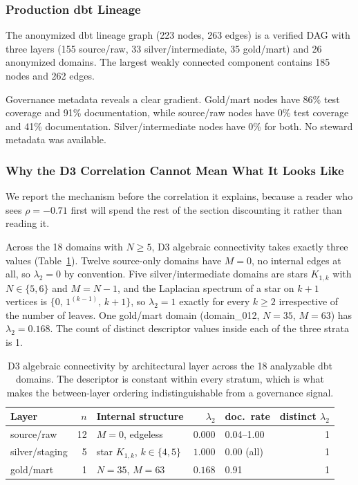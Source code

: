\documentclass[11pt,a4paper]{article}
\begin{document}
\subsubsection{Production dbt Lineage}

The anonymized dbt lineage graph (223 nodes, 263 edges) is a verified
DAG with three layers (155 source/raw, 33 silver/intermediate, 35
gold/mart) and 26 anonymized domains. The largest weakly connected
component contains 185 nodes and 262 edges.

Governance metadata reveals a clear gradient. Gold/mart nodes have
86\% test coverage and 91\% documentation, while source/raw nodes have
0\% test coverage and 41\% documentation. Silver/intermediate nodes
have 0\% for both. No steward metadata was available.

\subsubsection{Why the D3 Correlation Cannot Mean What It Looks Like}
\label{sec:degeneracy}

We report the mechanism before the correlation it explains, because a
reader who sees $\rho = -0.71$ first will spend the rest of the section
discounting it rather than reading it.

Across the 18 domains with $N \geq 5$, D3 algebraic connectivity takes
exactly three values (Table~\ref{tab:degeneracy}). Twelve source-only
domains have $M = 0$, no internal edges at all, so $\lambda_2 = 0$ by
convention. Five silver/intermediate domains are stars $K_{1,k}$ with
$N \in \{5,6\}$ and $M = N-1$, and the Laplacian spectrum of a star on
$k+1$ vertices is $\{0,\, 1^{(k-1)},\, k+1\}$, so $\lambda_2 = 1$
exactly for every $k \geq 2$ irrespective of the number of leaves. One
gold/mart domain (domain\_012, $N = 35$, $M = 63$) has
$\lambda_2 = 0.168$. The count of distinct descriptor values inside each
of the three strata is 1.

\begin{table}[htb]
\centering
\caption{D3 algebraic connectivity by architectural layer across the 18
  analyzable dbt domains. The descriptor is constant within every
  stratum, which is what makes the between-layer ordering
  indistinguishable from a governance signal.}
\label{tab:degeneracy}
\begin{tabular}{lrlrlr}
\toprule
Layer & $n$ & Internal structure & $\lambda_2$ & doc.\ rate & distinct $\lambda_2$ \\
\midrule
source/raw & 12 & $M = 0$, edgeless & $0.000$ & 0.04--1.00 & 1 \\
silver/staging & 5 & star $K_{1,k}$, $k \in \{4,5\}$ & $1.000$ & 0.00 (all) & 1 \\
gold/mart & 1 & $N = 35$, $M = 63$ & $0.168$ & 0.91 & 1 \\
\bottomrule
\end{tabular}
\end{table}
\end{document}
